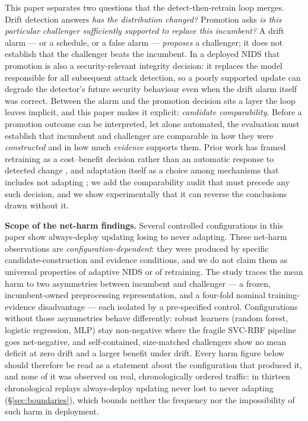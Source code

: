 \documentclass[a4paper,fleqn]{cas-sc}
\begin{document}
This paper separates two questions that the detect-then-retrain loop merges. Drift detection answers \emph{has the distribution changed?} Promotion asks \emph{is this particular challenger sufficiently supported to replace this incumbent?} A drift alarm --- or a schedule, or a false alarm --- \emph{proposes} a challenger; it does not establish that the challenger beats the incumbent. In a deployed NIDS that promotion is also a security-relevant integrity decision: it replaces the model responsible for all subsequent attack detection, so a poorly supported update can degrade the detector's future security behaviour even when the drift alarm itself was correct. Between the alarm and the promotion decision sits a layer the loop leaves implicit, and this paper makes it explicit: \emph{candidate comparability}. Before a promotion outcome can be interpreted, let alone automated, the evaluation must establish that incumbent and challenger are comparable in how they were \emph{constructed} and in how much \emph{evidence} supports them. Prior work has framed retraining as a cost--benefit decision rather than an automatic response to detected change \cite{zliobaite2015cost,mahadevan2024cost,regol2025retrain}, and adaptation itself as a choice among mechanisms that includes not adapting \cite{bakirov2021automated}; we add the comparability audit that must precede any such decision, and we show experimentally that it can reverse the conclusions drawn without it.


\textbf{Scope of the net-harm findings.} Several controlled configurations in this paper show always-deploy updating losing to never adapting. These net-harm observations are \emph{configuration-dependent}: they were produced by specific candidate-construction and evidence conditions, and we do not claim them as universal properties of adaptive NIDS or of retraining. The study traces the mean harm to two asymmetries between incumbent and challenger --- a frozen, incumbent-owned preprocessing representation, and a four-fold nominal training-evidence disadvantage --- each isolated by a pre-specified control. Configurations without those asymmetries behave differently: robust learners (random forest, logistic regression, MLP) stay non-negative where the fragile SVC-RBF pipeline goes net-negative, and self-contained, size-matched challengers show no mean deficit at zero drift and a larger benefit under drift. Every harm figure below should therefore be read as a statement about the configuration that produced it, and none of it was observed on real, chronologically ordered traffic: in thirteen chronological replays always-deploy updating never lost to never adapting (\S\ref{sec:boundaries}), which bounds neither the frequency nor the impossibility of such harm in deployment.
\end{document}
